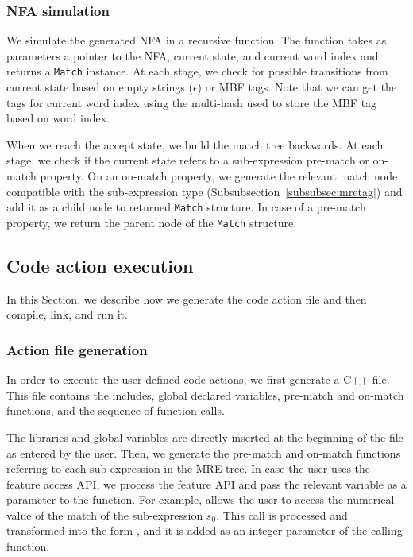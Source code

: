 \subsubsection{NFA simulation}

We simulate the generated NFA in a recursive function. 
The function takes as parameters a pointer to the NFA, current state, and current word index and returns a {\tt Match} instance. 
At each stage, we check for possible transitions from current state based on empty strings ($\epsilon$) or MBF tags. 
Note that we can get the tags for current word index using the multi-hash used to store the MBF tag based on word index.

When we reach the accept state, we build the match tree backwards. 
At each stage, we check if the current state refers to a sub-expression pre-match or on-match property. 
On an on-match property, we generate the relevant match node compatible with the sub-expression type (Subsubsection~\ref{subsubsec:mretag}) and add it as a child node to returned {\tt Match} structure. 
In case of a pre-match property, we return the parent node of the {\tt Match} structure.

\subsection{Code action execution}

In this Section, we describe how we generate the code action file and then compile, link, and run it.

\subsubsection{Action file generation}

In order to execute the user-defined code actions, we first generate a C++ file. 
This file contains the includes, global declared variables, pre-match and on-match functions, and the sequence of function calls. 

The libraries and global variables are directly inserted at the beginning of the file as entered by the user. 
Then, we generate the pre-match and on-match functions referring to each sub-expression in the MRE tree. 
In case the user uses the feature access API, we process the feature API and pass the relevant variable as a parameter to the function. 
For example,  allows the user to access the numerical value of the match of the sub-expression $s_0$. 
This call is processed and transformed into the form , and it is added as an integer parameter of the calling function.

